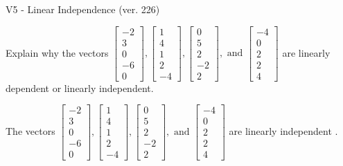 \begin{exercise}
  \begin{exerciseTitle}V5 - Linear Independence (ver. 226)\end{exerciseTitle}
  \begin{exerciseStatement}
    Explain why the vectors \(\left[\begin{array}{r}
-2 \\
3 \\
0 \\
-6 \\
0
\end{array}\right] , \left[\begin{array}{r}
1 \\
4 \\
1 \\
2 \\
-4
\end{array}\right] , \left[\begin{array}{r}
0 \\
5 \\
2 \\
-2 \\
2
\end{array}\right] , \text{ and } \left[\begin{array}{r}
-4 \\
0 \\
2 \\
2 \\
4
\end{array}\right]\) are linearly dependent or linearly independent.	


  \end{exerciseStatement}
  \begin{exerciseAnswer}
   The vectors \(\left[\begin{array}{r}
-2 \\
3 \\
0 \\
-6 \\
0
\end{array}\right] , \left[\begin{array}{r}
1 \\
4 \\
1 \\
2 \\
-4
\end{array}\right] , \left[\begin{array}{r}
0 \\
5 \\
2 \\
-2 \\
2
\end{array}\right] , \text{ and } \left[\begin{array}{r}
-4 \\
0 \\
2 \\
2 \\
4
\end{array}\right]\) are 
  	 linearly independent  .
  


  \end{exerciseAnswer}
\end{exercise}